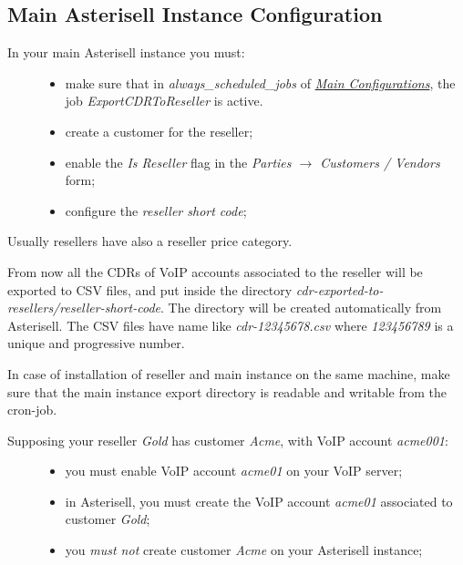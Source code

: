\documentclass[letterpaper,10pt,english]{sphinxmanual}
\begin{document}
\subsection{Main Asterisell Instance Configuration}
\label{index:main-asterisell-instance-configuration}\begin{description}
\item[{In your main Asterisell instance you must:}] \leavevmode\begin{itemize}
\item {} 
make sure that in \emph{always\_scheduled\_jobs} of {\hyperref[index:main-configurations]{\emph{Main Configurations}}}, the job \emph{ExportCDRToReseller} is active.

\item {} 
create a customer for the reseller;

\item {} 
enable the \emph{Is Reseller} flag in the \emph{Parties \(\rightarrow\) Customers / Vendors} form;

\item {} 
configure the \emph{reseller short code};

\end{itemize}

\end{description}

Usually resellers have also a reseller price category.

From now all the CDRs of VoIP accounts associated to the reseller will be exported to CSV files, and put inside the directory \emph{cdr-exported-to-resellers/reseller-short-code}. The directory will be created automatically from Asterisell. The CSV files have name like \emph{cdr-12345678.csv} where \emph{123456789} is a unique and progressive number.

In case of installation of reseller and main instance on the same machine, make sure that the main instance export directory is readable and writable from the cron-job.
\begin{description}
\item[{Supposing your reseller \emph{Gold} has customer \emph{Acme}, with VoIP account \emph{acme001}:}] \leavevmode\begin{itemize}
\item {} 
you must enable VoIP account \emph{acme01} on your VoIP server;

\item {} 
in Asterisell, you must create the VoIP account \emph{acme01} associated to customer \emph{Gold};

\item {} 
you \emph{must not} create customer \emph{Acme} on your Asterisell instance;

\end{itemize}

\end{description}
\end{document}
